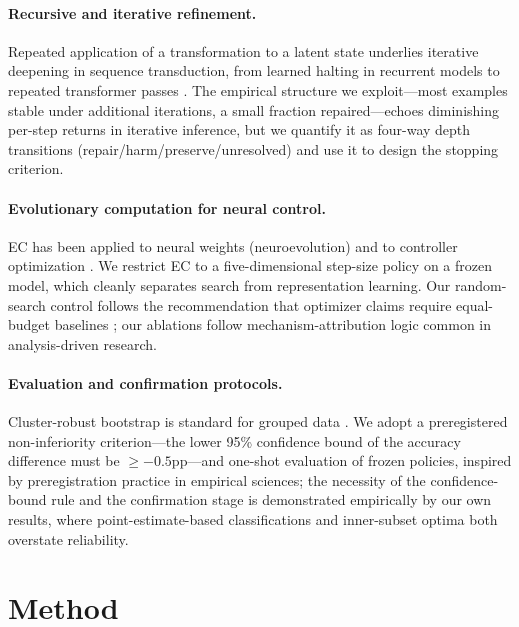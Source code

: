 \documentclass[11pt]{article}
\begin{document}
\paragraph{Recursive and iterative refinement.}
Repeated application of a transformation to a latent state underlies iterative deepening in sequence transduction, from learned halting in recurrent models \citep{graves2016adaptive} to repeated transformer passes \citep{dehghani2019universal}. The empirical structure we exploit---most examples stable under additional iterations, a small fraction repaired---echoes diminishing per-step returns in iterative inference, but we quantify it as four-way depth transitions (repair/harm/preserve/unresolved) and use it to design the stopping criterion.

\paragraph{Evolutionary computation for neural control.}
EC has been applied to neural weights (neuroevolution) \citep{stanley2019designing} and to controller optimization \citep{eiben2015introduction}. We restrict EC to a five-dimensional step-size policy on a frozen model, which cleanly separates search from representation learning. Our random-search control follows the recommendation that optimizer claims require equal-budget baselines \citep{eiben2015introduction}; our ablations follow mechanism-attribution logic common in analysis-driven research.

\paragraph{Evaluation and confirmation protocols.}
Cluster-robust bootstrap is standard for grouped data \citep{cameron2015practitioner}. We adopt a preregistered non-inferiority criterion---the lower 95\% confidence bound of the accuracy difference must be $\geq -0.5$pp---and one-shot evaluation of frozen policies, inspired by preregistration practice in empirical sciences; the necessity of the confidence-bound rule and the confirmation stage is demonstrated empirically by our own results, where point-estimate-based classifications and inner-subset optima both overstate reliability.

\section{Method}
\label{sec:method}
\end{document}
